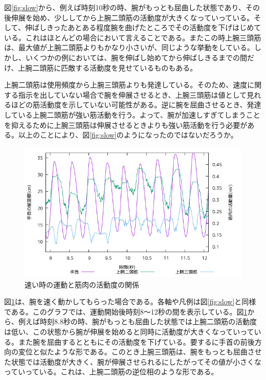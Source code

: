 \documentclass{jsarticle}
\begin{document}
図\ref{fig:slow}から、例えば時刻10秒の時、腕がもっとも屈曲した状態であり、その後伸展を始め、少ししてから上腕二頭筋の活動度が大きくなっていっている。そして、伸ばしきったあとある程度腕を曲げたところでその活動度を下げはじめている。これはほとんどの場合において言えることである。またこの時上腕三頭筋は、最大値が上腕二頭筋よりもかなり小さいが、同じような挙動をしている。しかし、いくつかの例においては、腕を伸ばし始めてから伸ばしきるまでの間だけ、上腕二頭筋に匹敵する活動度を見せているものもある。

上腕二頭筋は使用頻度から上腕三頭筋よりも発達している。そのため、速度に関する指示を出していない場合で腕を伸展させるとき、上腕三頭筋は値として見れるほどの筋活動度を示していない可能性がある。逆に腕を屈曲させるとき、発達している上腕二頭筋が強い筋活動を行う。よって、腕が加速しすぎてしまうことを抑えるために上腕三頭筋は伸展させるときよりも強い筋活動を行う必要がある。以上のことにより、図\ref{fig:slow}のようになったのではないだろうか。

\begin{figure}[b]
  \begin{center}
    \includegraphics[width=15cm]{images/s2proto.png}
  \end{center}
  \caption{速い時の運動と筋肉の活動度の関係}
  \label{fig:fast}
\end{figure}
図\ref{fig:fast}は、腕を速く動かしてもらった場合である。各軸や凡例は図\ref{fig:slow}と同様である。このグラフでは、運動開始後時刻8〜12秒の間を表示している。図\ref{fig:fast}から、例えば時刻8.8秒の時、腕がもっとも屈曲した状態では上腕二頭筋の活動度は低い、この状態から腕が伸展を始めると同時に活動度が大きくなっていっている。また腕を屈曲するとともにその活動度を下げている。要するに手首の前後方向の変位と似たような形である。このとき上腕三頭筋は、腕をもっとも屈曲させた状態では活動度が大きく、腕が伸展させられるにしたがってその値が小さくなっていっている。これは、上腕二頭筋の逆位相のような形である。
\end{document}
